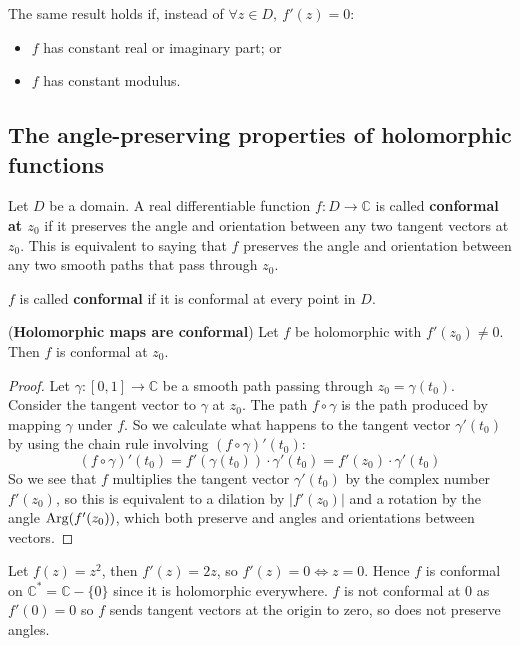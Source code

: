 \begin{remark}
	The same result holds if, instead of $\forall z \in D, \ f'(z) = 0$:
	\begin{itemize}
		\item $f$ has constant real or imaginary part; or
		\item $f$ has constant modulus.
	\end{itemize}
\end{remark}

\subsection{The angle-preserving properties of holomorphic functions}

\begin{definition}
	Let $D$ be a domain. A real differentiable function $f: D \to \mathbb{C}$ is called \textbf{conformal at $z_0$} if it preserves the angle and orientation between any two tangent vectors at $z_0$. This is equivalent to saying that $f$ preserves the angle and orientation between any two smooth paths that pass through $z_0$.

	$f$ is called \textbf{conformal} if it is conformal at every point in $D$.
\end{definition}

\begin{lemma}\label{lem:holomorphicImpliesConformal}
	(\textbf{Holomorphic maps are conformal}) Let $f$ be holomorphic with $f'(z_0) \ne 0$. Then $f$ is conformal at $z_0$.
\end{lemma}

\begin{proof}
	Let $\gamma: [0, 1] \to \mathbb{C}$ be a smooth path passing through $z_0 = \gamma(t_0)$. Consider the tangent vector to $\gamma$ at $z_0$. The path $f \circ \gamma$ is the path produced by mapping $\gamma$ under $f$. So we calculate what happens to the tangent vector $\gamma'(t_0)$ by using the chain rule involving $(f \circ \gamma)'(t_0)$:
	\[
		(f \circ \gamma)'(t_0) = f'(\gamma(t_0)) \cdot \gamma'(t_0) = f'(z_0) \cdot \gamma'(t_0)
	\]
	So we see that $f$ multiplies the tangent vector $\gamma'(t_0)$ by the complex number $f'(z_0)$, so this is equivalent to a dilation by $|f'(z_0)|$ and a rotation by the angle $\text{Arg}(f'(z_0))$, which both preserve and angles and orientations between vectors.
\end{proof}

\begin{example}
	Let $f(z) = z^2$, then $f'(z) = 2z$, so $f'(z) = 0 \Longleftrightarrow z = 0$. Hence $f$ is conformal on $\mathbb{C}^* = \mathbb{C} - \{ 0 \}$ since it is holomorphic everywhere. $f$ is not conformal at $0$ as $f'(0) = 0$ so $f$ sends tangent vectors at the origin to zero, so does not preserve angles.
\end{example}

